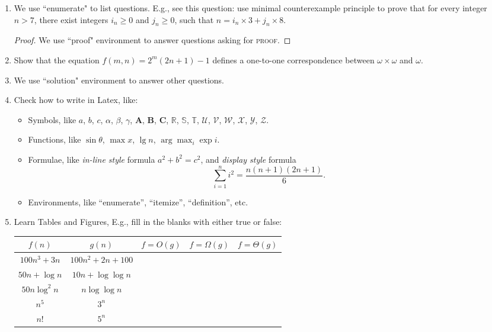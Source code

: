 \documentclass[12pt,a4paper]{article}
\makeatletter
\newtheorem*{solution}{Solution}
\theoremstyle{definition}
\renewenvironment{solution}[1][Solution] {\par\pushQED{\qed}\normalfont\topsep6\p@\@plus6\p@\relax\trivlist\item[\hskip\labelsep\bfseries#1\@addpunct{.}]\ignorespaces}{\popQED\endtrivlist\@endpefalse} \makeatother
\makeatother
\begin{document}
\begin{enumerate}

\item {\color{blue}We use ``enumerate" to list questions. E.g., see this question:} use minimal counterexample principle to prove that for every integer $n>7$, there exist integers $i_n\ge 0$ and $j_n\ge 0$, such that $n = i_n \times 3 + j_n \times 8$.

\begin{proof}
We use ``proof" environment to answer questions asking for \textsc{proof}.
\end{proof}

\item Show that the equation $f(m,n)=2^m(2n+1)-1$ defines a one-to-one correspondence between $\omega \times \omega$ and $\omega$.

\begin{solution}
We use ``solution" environment to answer other questions.
\end{solution}

\item Check how to write in Latex, like:

\begin{itemize}
\item Symbols, like $a$, $b$, $c$, $\alpha$, $\beta$, $\gamma$, $\mathbf{A}$, $\mathbf{B}$, $\mathbf{C}$, $\mathbb{R}$, $\mathbb{S}$, $\mathbb{T}$, $\mathcal{U}$, $\mathcal{V}$, $\mathcal{W}$, $\mathscr{X}$, $\mathscr{Y}$, $\mathscr{Z}$.
\item Functions, like $\sin\theta$, $\max x$, $\lg n$, $\arg \max_i \exp i$.
\item Formulae, like \emph{in-line style} formula $a^2+b^2=c^2$, and \emph{display style} formula $$\sum_{i=1}^n i^2 = \frac{n(n+1)(2n+1)}{6}.$$
\item Environments, like ``enumerate'', ``itemize'', ``definition'', etc.
\end{itemize}

\item Learn Tables and Figures, E.g., fill in the blanks with either true or false:

\begin{table}[h]
	\centering
	\begin{tabular}{|c|c|c|c|c|}
		\hline
		$f(n)$ & $g(n)$ & $f=O(g)$ & $f=\Omega(g)$ & $f=\Theta(g)$ \\
		\hline
		\hline
		$100n^3+3n$ & $100n^2+2n+100$ &  &  & \\
		\hline
		$50n+\log n$ & $10n+\log \log n$ &  &  &  \\
		\hline
		$50n\log^2 n$ & $n \log\log n$ &  &  &  \\
		\hline
		$n^5$ & $3^n$ &  &  &  \\
		\hline
		$n!$ & $5^n$ &  &  &  \\
		\hline
	\end{tabular}
\end{table}


\end{enumerate}
\end{document}
